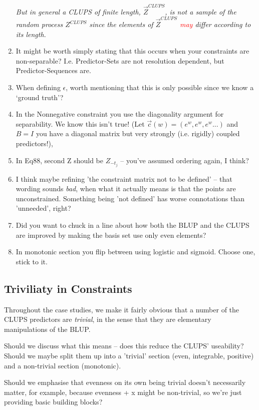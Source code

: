 \documentclass[]{article}
\begin{document}
\begin{enumerate}
			{\it But in general a CLUPS of finite length, $\vec{Z}^{CLUPS}$, is not a sample of the random process ${Z}^{CLUPS}$ since the elements of $\vec{Z}^{CLUPS}$ \textcolor{red}{may} differ according to its length.}

			\item It might be worth simply stating that this occurs when your constraints are non-separable? I.e. Predictor-Sets are not resolution dependent, but Predictor-Sequences are. 
			
			\item When defining $\epsilon$, worth mentioning that this is only possible since we know a `ground truth'?
			\item In the Nonnegative constraint you use the diagonality argument for separability. We know this isn't true! (Let $\vec{c}(w) = (e^{w},e^{w}, e^w...)$ and $B = I$ you have a diagonal matrix but very strongly (i.e. rigidly) coupled predictors!),
			\item In Eq88, second Z should be $Z_{-t_j}$ -- you've assumed ordering again, I think?
			\item I think maybe refining 'the constraint matrix not to be defined' -- that wording sounds \textit{bad}, when what it actually means is that the points are unconstrained. Something being 'not defined' has worse connotations than 'unneeded', right?
			\item Did you want to chuck in a line about how both the BLUP and the CLUPS are improved by making the basis set use only even elements?
			\item In monotonic section you flip between using logistic and sigmoid. Choose one, stick to it.
		
		\end{enumerate}
					
		\subsection{Triviliaty in Constraints}

			Throughout the case studies, we make it fairly obvious that a number of the CLUPS predictors are \textit{trivial}, in the sense that they are elementary manipulations of the BLUP.

			Should we discuss what this means -- does this reduce the CLUPS' useability? Should we maybe split them up into a 'trivial' section (even, integrable, positive) and a non-trivial section (monotonic).

			Should we emphasise that evenness on its own being trivial doesn't necessarily matter, for example, because evenness + x might be non-trivial, so we're just providing basic building blocks?
\end{document}
